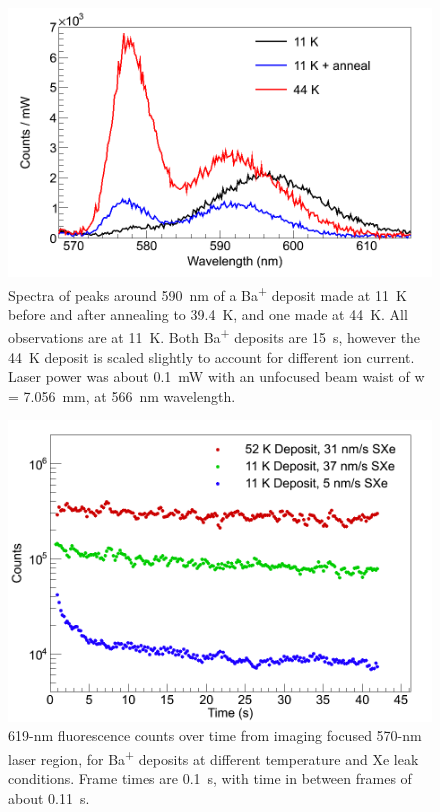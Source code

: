 \begin{figure} %
        \centering
                \includegraphics[width=.7\textwidth]{figures/spectra_temperature_conditions.png}
                \caption{Spectra of peaks around 590~nm of a Ba\textsuperscript{+} deposit made at 11~K before and after annealing to 39.4~K, and one made at 44~K.  All observations are at 11~K.  Both Ba\textsuperscript{+} deposits are 15~s, however the 44~K deposit is scaled slightly to account for different ion current.  Laser power was about 0.1~mW with an unfocused beam waist of w = 7.056~mm, at 566~nm wavelength.}
\label{fig:specTempConditions}
\end{figure}

\begin{figure} [h]
        \centering
                \includegraphics[width=.7\textwidth]{figures/619_deposit_conditions.png}
                \caption{619-nm fluorescence counts over time from imaging focused 570-nm laser region, for Ba\textsuperscript{+} deposits at different temperature and Xe leak conditions.  Frame times are 0.1~s, with time in between frames of about 0.11~s.}
\label{fig:specTempConditions619}
\end{figure}

